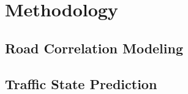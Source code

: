 
\section{Methodology}

\subsection{Road Correlation Modeling}

\subsection{Traffic State Prediction}
